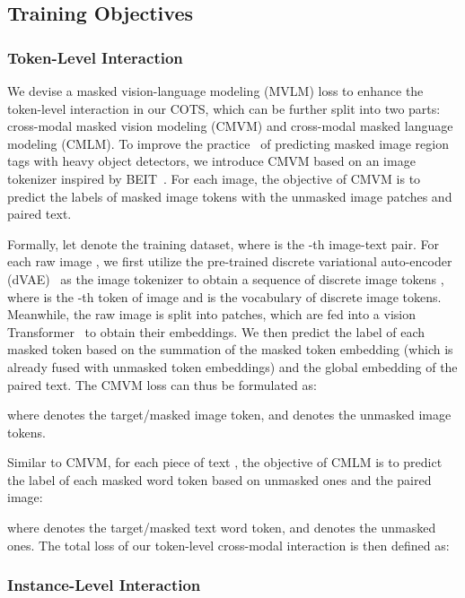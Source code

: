 \documentclass[10pt,twocolumn,letterpaper]{article}
\begin{document}
\subsection{Training Objectives}

\subsubsection{Token-Level Interaction}

We devise a masked vision-language modeling (MVLM) loss to enhance the token-level interaction in our COTS, which can be further split into two parts: cross-modal masked vision modeling (CMVM) and cross-modal masked language modeling (CMLM). To improve the practice~\cite{chen2020uniter, li2020oscar} of predicting masked image region tags with heavy object detectors, we introduce CMVM based on an image tokenizer inspired by BEIT~\cite{bao2021beit}. For each image, the objective of CMVM is to predict the labels of masked image tokens with the unmasked image patches and paired text.

Formally, let  denote the training dataset, where  is the -th image-text pair. For each raw image , we first utilize the pre-trained discrete variational auto-encoder (dVAE)~\cite{ramesh2021zero} as the image tokenizer to obtain a sequence of  discrete image tokens , where  is the -th token of image  and  is the vocabulary of discrete image tokens. Meanwhile, the raw image is split into  patches, which are fed into a vision Transformer~\cite{dosovitskiy2021an} to obtain their embeddings. We then predict the label of each masked token based on the summation of the masked token embedding (which is already fused with unmasked token embeddings) and the global embedding of the paired text. The CMVM loss can thus be formulated as:

where  denotes the target/masked image token, and  denotes the unmasked image tokens.

Similar to CMVM, for each piece of text , the objective of CMLM is to predict the label of each masked word token based on unmasked ones and the paired image:

where  denotes the target/masked text word token, and  denotes the unmasked ones. The total loss of our token-level cross-modal interaction is then defined as:



\subsubsection{Instance-Level Interaction}
\label{instance}
\end{document}
